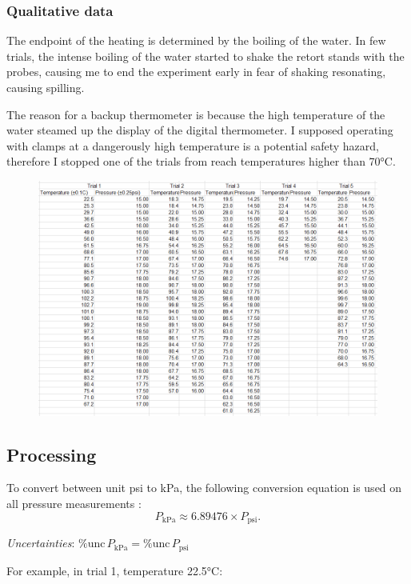 \documentclass[a4paper,12pt]{article}
\newcommand{\relun}{\% \text{unc}\,}
\begin{document}
\subsubsection*{Qualitative data}
The endpoint of the heating is determined by the boiling of the water. In few trials, the intense boiling of the water started to shake the retort stands with the probes, causing me to end the experiment early in fear of shaking resonating, causing spilling.

The reason for a backup thermometer is because the high temperature of the water steamed up the display of the digital thermometer. I supposed operating with clamps at a dangerously high temperature is a potential safety hazard, therefore I stopped one of the trials from reach temperatures higher than 70$\si{\celsius}$.

\begin{figure}[H]
    \centering
    \includegraphics[width=\textwidth]{assets/rawdata.png}
\end{figure}

\subsection{Processing}
To convert between unit psi to kPa, the following conversion equation is used on all pressure measurements \parencite{conver_units}:
\[
    P_{\text{kPa}} \approx 6.89476 \times P_{\text{psi}}.
\]

\textit{Uncertainties}: $\relun P_{\text{kPa}} = \relun P_{\text{psi}}$

For example, in trial 1, temperature 22.5$\si{\celsius}$:
\end{document}
